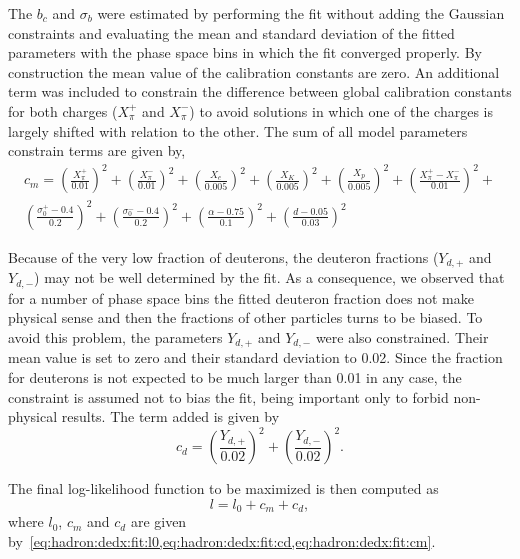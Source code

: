 The $b_c$ and $\sigma_b$ were
estimated by performing the fit without adding
the Gaussian constraints and evaluating
the mean and standard deviation of the fitted parameters
with the phase space bins in which the fit converged properly.
By construction the mean value of the calibration constants
are zero. An additional term was included to constrain the
difference between global calibration constants for both
charges ($X_{\pi}^+$ and $X_{\pi}^-$) to avoid solutions
in which one of the charges is largely shifted
with relation to the other.
The sum of all model parameters constrain terms are given by,
\begin{multline}
  c_m = \left(\frac{X_{\pi}^+}{0.01}\right)^2+\left(\frac{X_{\pi}^-}{0.01}\right)^2+
  \left(\frac{X_{e}}{0.005}\right)^2+\left(\frac{X_{K}}{0.005}\right)^2+
  \left(\frac{X_{p}}{0.005}\right)^2+\left(\frac{X_{\pi}^+-X_{\pi}^-}{0.01}\right)^2+\\
  \left(\frac{\sigma_0^+-0.4}{0.2}\right)^2+\left(\frac{\sigma_0^--0.4}{0.2}\right)^2+
  \left(\frac{\alpha-0.75}{0.1}\right)^2+\left(\frac{d-0.05}{0.03}\right)^2
  \label{eq:hadron:dedx:fit:cm}
\end{multline}

Because of the very low fraction of deuterons,
the deuteron fractions ($Y_{d,+}$ and $Y_{d,-}$)
may not be well determined by the fit. As a consequence, we
observed that for a number of phase space bins the fitted deuteron
fraction does not make physical sense and then the fractions
of other particles turns to be biased. To avoid this problem,
the parameters $Y_{d,+}$ and $Y_{d,-}$ were also
constrained. Their mean value is set
to zero and their standard deviation to 0.02.
Since the fraction for deuterons is not expected
to be much larger than 0.01 in any case, the constraint
is assumed not to bias the fit, being important
only to forbid non-physical results. The term added
is given by
\begin{equation}
  c_d = \left(\frac{Y_{d,+}}{0.02}\right)^2+\left(\frac{Y_{d,-}}{0.02}\right)^2.
  \label{eq:hadron:dedx:fit:cd}
\end{equation}

The final log-likelihood function to be maximized is then
computed as
\begin{equation}
  l = l_0+c_m+c_d,
  \label{eq:hadron:dedx:fit:l}
\end{equation}
where $l_0$, $c_m$ and $c_d$ are given
by~\cref{eq:hadron:dedx:fit:l0,eq:hadron:dedx:fit:cd,eq:hadron:dedx:fit:cm}.

